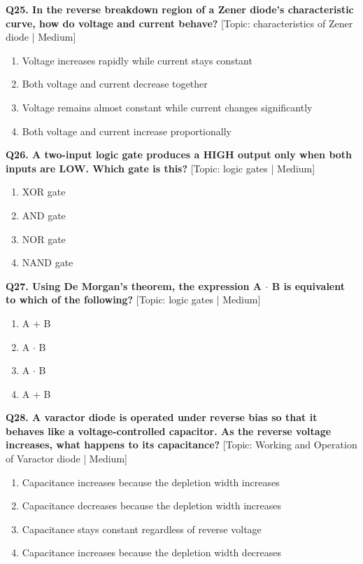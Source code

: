 \noindent\textbf{Q25. In the reverse breakdown region of a Zener diode's characteristic curve, how do voltage and current behave?} \hfill [Topic: characteristics of Zener diode | Medium]
\begin{enumerate}[label=(\alph*),topsep=2pt,itemsep=1pt,partopsep=0pt,parsep=0pt]
    \item {Voltage increases rapidly while current stays constant}
    \item {Both voltage and current decrease together}
    \item {Voltage remains almost constant while current changes significantly}
    \item {Both voltage and current increase proportionally}
\end{enumerate}
\vspace{2mm}

\noindent\textbf{Q26. A two-input logic gate produces a HIGH output only when both inputs are LOW. Which gate is this?} \hfill [Topic: logic gates | Medium]
\begin{enumerate}[label=(\alph*),topsep=2pt,itemsep=1pt,partopsep=0pt,parsep=0pt]
    \item {XOR gate}
    \item {AND gate}
    \item {NOR gate}
    \item {NAND gate}
\end{enumerate}
\vspace{2mm}

\noindent\textbf{Q27. Using De Morgan's theorem, the expression A $\cdot$ B is equivalent to which of the following?} \hfill [Topic: logic gates | Medium]
\begin{enumerate}[label=(\alph*),topsep=2pt,itemsep=1pt,partopsep=0pt,parsep=0pt]
    \item {A + B}
    \item {A $\cdot$ B}
    \item {A $\cdot$ B}
    \item {A + B}
\end{enumerate}
\vspace{2mm}

\noindent\textbf{Q28. A varactor diode is operated under reverse bias so that it behaves like a voltage-controlled capacitor. As the reverse voltage increases, what happens to its capacitance?} \hfill [Topic: Working and Operation of Varactor diode | Medium]
\begin{enumerate}[label=(\alph*),topsep=2pt,itemsep=1pt,partopsep=0pt,parsep=0pt]
    \item {Capacitance increases because the depletion width increases}
    \item {Capacitance decreases because the depletion width increases}
    \item {Capacitance stays constant regardless of reverse voltage}
    \item {Capacitance increases because the depletion width decreases}
\end{enumerate}
\vspace{2mm}

